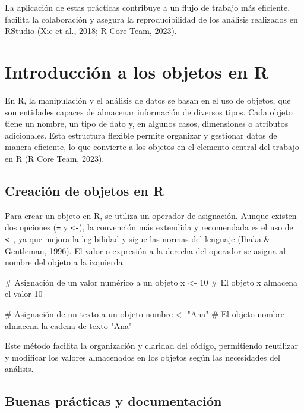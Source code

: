 \documentclass[
  spanish,
  a4paper,
  DIV=11,
  numbers=noendperiod,
  onepage,
  openany]{scrreprt}
\newenvironment{Shaded}{\begin{snugshade}}{\end{snugshade}}
\newcommand{\CommentTok}[1]{\textcolor[rgb]{0.37,0.37,0.37}{#1}}
\newcommand{\DecValTok}[1]{\textcolor[rgb]{0.68,0.00,0.00}{#1}}
\newcommand{\NormalTok}[1]{\textcolor[rgb]{0.00,0.23,0.31}{#1}}
\newcommand{\OtherTok}[1]{\textcolor[rgb]{0.00,0.23,0.31}{#1}}
\newcommand{\StringTok}[1]{\textcolor[rgb]{0.13,0.47,0.30}{#1}}
\begin{document}
La aplicación de estas prácticas contribuye a un flujo de trabajo más
eficiente, facilita la colaboración y asegura la reproducibilidad de los
análisis realizados en RStudio (Xie et al., 2018; R Core Team, 2023).

\section{Introducción a los objetos en
R}\label{introducciuxf3n-a-los-objetos-en-r}

En R, la manipulación y el análisis de datos se basan en el uso de
objetos, que son entidades capaces de almacenar información de diversos
tipos. Cada objeto tiene un nombre, un tipo de dato y, en algunos casos,
dimensiones o atributos adicionales. Esta estructura flexible permite
organizar y gestionar datos de manera eficiente, lo que convierte a los
objetos en el elemento central del trabajo en R (R Core Team, 2023).

\subsection{Creación de objetos en R}\label{creaciuxf3n-de-objetos-en-r}

Para crear un objeto en R, se utiliza un operador de asignación. Aunque
existen dos opciones (\texttt{=} y \texttt{\textless{}-}), la convención
más extendida y recomendada es el uso de \texttt{\textless{}-}, ya que
mejora la legibilidad y sigue las normas del lenguaje (Ihaka \&
Gentleman, 1996). El valor o expresión a la derecha del operador se
asigna al nombre del objeto a la izquierda.

\begin{Shaded}
\begin{Highlighting}[]
\CommentTok{\# Asignación de un valor numérico a un objeto}
\NormalTok{x }\OtherTok{\textless{}{-}} \DecValTok{10}  \CommentTok{\# El objeto x almacena el valor 10}

\CommentTok{\# Asignación de un texto a un objeto}
\NormalTok{nombre }\OtherTok{\textless{}{-}} \StringTok{"Ana"}  \CommentTok{\# El objeto nombre almacena la cadena de texto "Ana"}
\end{Highlighting}
\end{Shaded}

Este método facilita la organización y claridad del código, permitiendo
reutilizar y modificar los valores almacenados en los objetos según las
necesidades del análisis.

\subsection{Buenas prácticas y
documentación}\label{buenas-pruxe1cticas-y-documentaciuxf3n}
\end{document}
